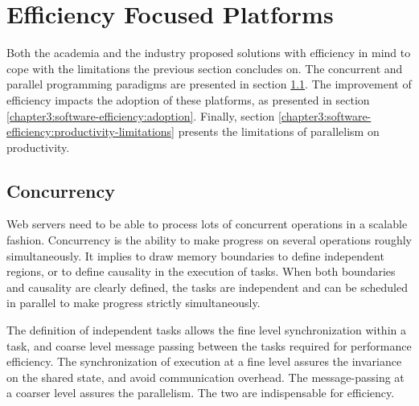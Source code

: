 \section{Efficiency Focused Platforms} \label{chapter3:software-efficiency}

Both the academia and the industry proposed solutions with efficiency in mind to cope with the limitations the previous section concludes on.
The concurrent and parallel programming paradigms are presented in section \ref{chapter3:software-efficiency:concurrency}.
The improvement of efficiency impacts the adoption of these platforms, as presented in section \ref{chapter3:software-efficiency:adoption}.
Finally, section \ref{chapter3:software-efficiency:productivity-limitations} presents the limitations of parallelism on productivity.

\subsection{Concurrency} \label{chapter3:software-efficiency:concurrency}

\begin{figure}[h!]
%
\end{figure}

Web servers need to be able to process lots of concurrent operations in a scalable fashion.
Concurrency is the ability to make progress on several operations roughly simultaneously.
It implies to draw memory boundaries to define independent regions, or to define causality in the execution of tasks.
When both boundaries and causality are clearly defined, the tasks are independent and can be scheduled in parallel to make progress strictly simultaneously.

The definition of independent tasks allows the fine level synchronization within a task, and coarse level message passing between the tasks required for performance efficiency.
The synchronization of execution at a fine level assures the invariance on the shared state, and avoid communication overhead.
The message-passing at a coarser level assures the parallelism.
The two are indispensable for efficiency.

